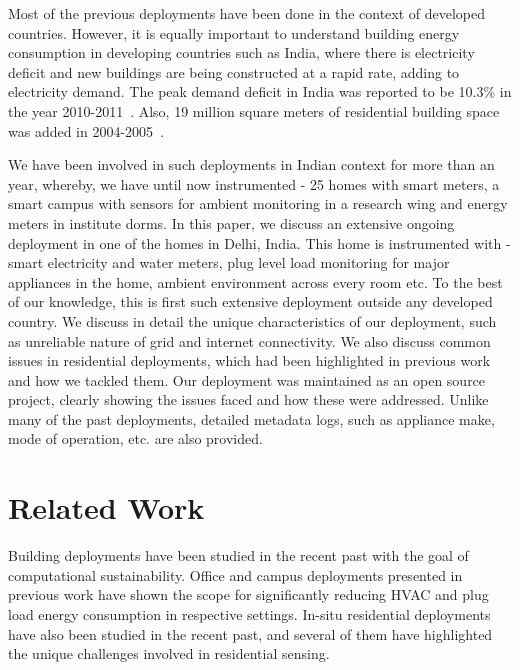 \documentclass[10pt]{sensys-proc}
\begin{document}
 Most of the previous deployments have been done in the context of developed countries. However, it is equally important to understand building energy consumption in developing countries such as India, where there is electricity deficit and new buildings are being constructed at a rapid rate, adding to electricity demand. The peak demand deficit in India was reported to be 10.3\% in the year 2010-2011~\cite{india_energy_book}. Also, 19 million square meters of residential building space was added in 2004-2005~\cite{evans09india}.

We have been involved in such deployments in Indian context for more than an year, whereby, we have until now instrumented - 25 homes with smart meters, a smart campus with sensors for ambient monitoring in a research wing and energy meters in institute dorms.
In this paper, we discuss an extensive ongoing deployment in one of the homes in Delhi, India. This home is instrumented with - smart electricity and water meters, plug level load monitoring for major appliances in the home, ambient environment across every room etc. To the best of our knowledge, this is first such extensive deployment outside any developed country. We discuss in detail the unique characteristics of our deployment, such as unreliable nature of grid and internet connectivity. We also discuss common issues in residential deployments, which had been highlighted in previous work and how we tackled them. Our deployment was maintained as an open source project, clearly showing the issues faced and how these were addressed. Unlike many of the past deployments, detailed metadata logs, such as appliance make, mode of operation, etc. are also provided. 

\section{Related Work}
Building deployments have been studied in the recent past with the goal of computational sustainability. Office and campus deployments presented in previous work \cite{yuvraj_dashboard,yuvraj_ipsn,batra} have shown the scope for significantly reducing HVAC and plug load energy consumption in respective settings. In-situ residential deployments have also been studied in the recent past, and several of them have highlighted the unique challenges involved in residential sensing.
\end{document}
